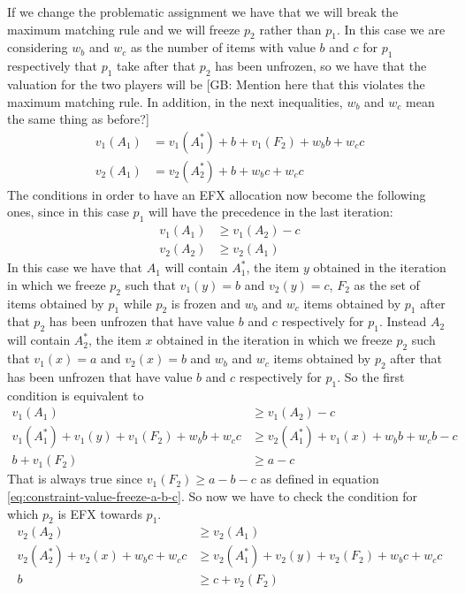 \documentclass{article}
\newcommand{\gb}[1]{{\color{red}[GB: #1]}}
\begin{document}
If we change the problematic assignment we have that we will break the maximum matching rule and we will freeze $p_2$ rather than $p_1$. In this case we are considering $w_b$ and $w_c$ as the number of items with value $b$ and $c$ for $p_1$ respectively that $p_1$ take after that $p_2$ has been unfrozen, so we have that the valuation for the two players will be 
\gb{Mention here that this violates the maximum matching rule. In addition, in the next inequalities, $w_b$ and $w_c$ mean the same thing as before?}
\begin{align*}
    v_1(A_1) &= v_1(A_1^*) + b + v_1(F_2) + w_b b + w_c c\\
    v_2(A_1) &= v_2(A_2^*) + b + w_b c + w_c c
\end{align*}
The conditions in order to have an EFX allocation now become the following ones, since in this case $p_1$ will have the precedence in the last iteration: 
\begin{align}
    v_1(A_1) &\ge v_1(A_2) - c\label{eq:condition-1-a1>a2-ch1-first-block-bb-assignment}\\
    v_2(A_2) &\ge v_2(A_1)\label{eq:condition-1-a2>a1-c-ch1-first-block-bb-assignment}
\end{align}
In this case we have that $A_1$ will contain $A_1^*$, the item $y$ obtained in the iteration in which we freeze $p_2$ such that $v_1(y) =  b$ and $v_2(y) = c$, $F_2$ as the set of items obtained by $p_1$ while $p_2$ is frozen and $w_b$ and $w_c$ items obtained by $p_1$ after that $p_2$ has been unfrozen that have value $b$ and $c$ respectively for $p_1$. Instead $A_2$ will contain $A_2^*$, the item $x$ obtained in the iteration in which we freeze $p_2$ such that $v_1(x) =  a$ and $v_2(x) = b$ and $w_b$ and $w_c$ items obtained by $p_2$ after that has been unfrozen that have value $b$ and $c$ respectively for $p_1$. So the first condition is equivalent to 
\begin{align*}
    v_1(A_1) &\ge v_1(A_2) -c\\
    v_1(A_1^*) + v_1(y) + v_1(F_2)+ w_b b + w_c c &\ge v_2(A_1^*) + v_1(x) + w_b b + w_c b - c\\
    b  + v_1(F_2)&\ge  a - c 
\end{align*}
That is always true since $ v_1(F_2) \ge  a-b-c$ as defined in equation \ref{eq:constraint-value-freeze-a-b-c}. So now we have to check the condition for which $p_2$ is EFX towards $p_1$.
\begin{align*}
    v_2(A_2) &\ge v_2(A_1)\\
    v_2(A_2^*) + v_2(x) + w_b c + w_c c &\ge  v_2(A_1^*) + v_2(y) + v_2(F_2)+ w_b c + w_c c\\
    b  &\ge  c + v_2(F_2)
\end{align*}
\end{document}
